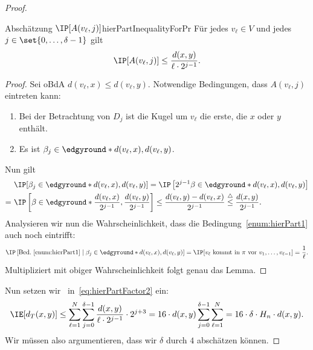 \documentclass[language=ngerman,algolist]{TemplateLecture}
\begin{document}
\begin{proof}
    \begin{lem}{Abschätzung $\IP[A(v_\ell, j)]$}{hierPartInequalityForPr}
        Für jedes $v_\ell \in V$ und jedes $j \in \set{0,\ldots,\delta - 1}$ gilt 
        \begin{equation*}
            \IP[A(v_\ell, j)] \leq \frac{d(x,y)}{\ell \cdot 2^{j-1}}.
        \end{equation*}
    \end{lem}
    \begin{proof}
        Sei oBdA $d(v_\ell, x) \leq d(v_\ell, y)$. Notwendige Bedingungen, dass $A(v_\ell, j)$ eintreten kann:
        \begin{enumerate}
            \item Bei der Betrachtung von $D_j$ ist die Kugel um $v_\ell$ die erste, die $x$ oder $y$ enthält.\label{enum:hierPart1}
            \item Es ist $\beta_j \in \edgyround*{d(v_\ell, x), d(v_\ell, y)}$.
        \end{enumerate}
        Nun gilt 
        \begin{equation*}
            \begin{split}
                &\IP[\beta_j \in \edgyround*{d(v_\ell, x), d(v_\ell, y)}] = \IP\left[2^{j-1}\beta \in \edgyround*{d(v_\ell, x), d(v_\ell, y)}\right] \\
                =~& \IP\left[\beta \in \edgyround*{\frac{d(v_\ell, x)}{2^{j-1}}, \frac{d(v_\ell, y)}{2^{j-1}}}\right] \leq \frac{d(v_\ell, y) - d(v_\ell, x)}{2^{j-1}} \overset{\triangle}{\leq} \frac{d(x,y)}{2^{j-1}}.
            \end{split} 
        \end{equation*}
        Analysieren wir nun die Wahrscheinlichkeit, dass die Bedingung~\ref{enum:hierPart1} auch noch eintrifft:
        \begin{equation*}
            \IP\left[ \text{Bed.~\ref{enum:hierPart1}} \mid \beta_j \in \edgyround*{d(v_\ell, x), d(v_\ell, y)} \right] = \IP[\text{$v_\ell$ kommt in $\pi$ vor $v_1, \ldots, v_{\ell - 1}$}] = \frac{1}{\ell}.
        \end{equation*}
        Multipliziert mit obiger Wahrscheinlichkeit folgt genau das Lemma.
    \end{proof}
    Nun setzen wir~ in~\eqref{eq:hierPartFactor2} ein:
    \begin{equation}
        \IE[d_T(x,y)] \leq \sum_{\ell = 1}^N \sum_{j = 0}^{\delta - 1} \frac{d(x,y)}{\ell \cdot 2^{j-1}} \cdot 2^{j + 3} = 16 \cdot d(x,y) \sum_{j = 0}^{\delta - 1} \sum_{\ell = 1}^N  = 16 \cdot \delta \cdot H_n \cdot d(x,y). \label{eq:hierPartFactor3}
    \end{equation}
    Wir müssen also argumentieren, dass wir $\delta$ durch $4$ abschätzen können.


\end{proof}
\end{document}
